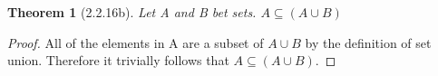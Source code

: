\documentclass[a4paper, 12pt]{article}
\theoremstyle{plain}
\newtheorem*{theorem*}{Theorem}
\begin{document}
	
	\begin{theorem*}[2.2.16b]
		Let A and B bet sets. $A \subseteq (A \cup B)$
	\end{theorem*}
	
	\begin{proof}
		All of the elements in A are a subset of $A \cup B$ by the definition of set union. Therefore it trivially follows that $A \subseteq (A \cup B)$.
	\end{proof}
\end{document}
